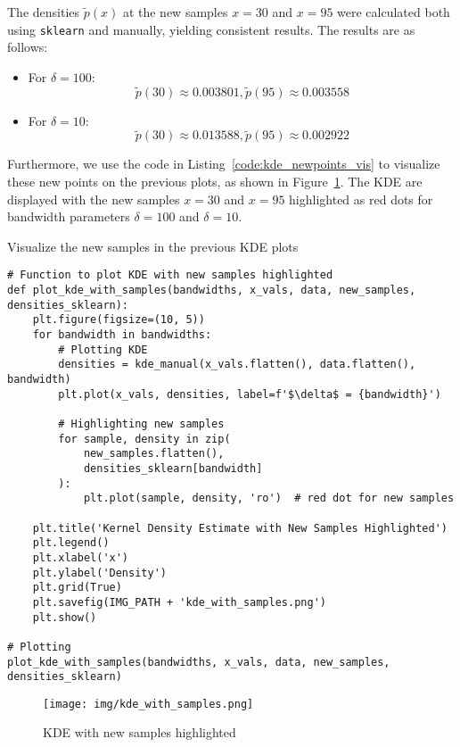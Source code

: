 \documentclass{article}
\begin{document}
The densities \( \tilde{p}(x) \) at the new samples \(x = 30\) and \(x = 95\) were calculated both using \texttt{sklearn} and manually, yielding consistent results. The results are as follows:

\begin{itemize}
    \item For \( \delta = 100 \):
    \[\tilde{p}(30) \approx 0.003801, \tilde{p}(95) \approx 0.003558\]
    \item For \( \delta = 10 \):
    \[\tilde{p}(30) \approx 0.013588, \tilde{p}(95) \approx 0.002922\]
\end{itemize}

Furthermore, we use the code in Listing~\ref{code:kde_newpoints_vis} to visualize these new points on the previous plots, as shown in Figure~\ref{fig:kde_newsamples_vis}.  The KDE are displayed with the new samples \(x = 30\) and \(x = 95\) highlighted as red dots for bandwidth parameters \( \delta = 100 \) and \( \delta = 10 \).

\begin{listing}[H]
\caption{Visualize the new samples in the previous KDE plots}
\label{code:kde_newpoints_vis}
\begin{verbatim}
# Function to plot KDE with new samples highlighted
def plot_kde_with_samples(bandwidths, x_vals, data, new_samples, densities_sklearn):
    plt.figure(figsize=(10, 5))
    for bandwidth in bandwidths:
        # Plotting KDE
        densities = kde_manual(x_vals.flatten(), data.flatten(), bandwidth)
        plt.plot(x_vals, densities, label=f'$\delta$ = {bandwidth}')
        
        # Highlighting new samples
        for sample, density in zip(
            new_samples.flatten(), 
            densities_sklearn[bandwidth]
        ):
            plt.plot(sample, density, 'ro')  # red dot for new samples
    
    plt.title('Kernel Density Estimate with New Samples Highlighted')
    plt.legend()
    plt.xlabel('x')
    plt.ylabel('Density')
    plt.grid(True)
    plt.savefig(IMG_PATH + 'kde_with_samples.png')
    plt.show()

# Plotting
plot_kde_with_samples(bandwidths, x_vals, data, new_samples, densities_sklearn)
\end{verbatim}
\end{listing}

\begin{figure}
    \centering
    \texttt{[image: img/kde\_with\_samples.png]}
    \caption{KDE with new samples highlighted}
    \label{fig:kde_newsamples_vis}
\end{figure}
\end{document}
